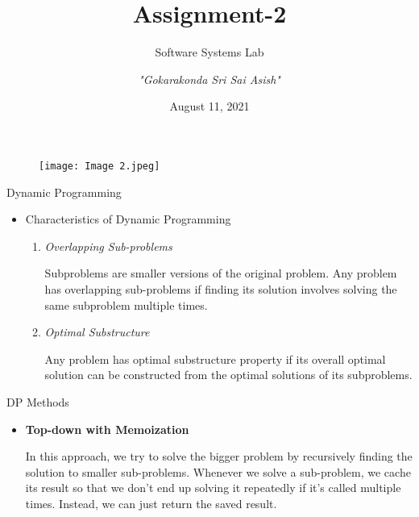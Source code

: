\documentclass{beamer}
\title{Assignment-2}
\subtitle{Software Systems Lab}
\author{\textit{"Gokarakonda Sri Sai Asish"}}
\institute{IIT Dharwad \newline \url{https://www.iitdh.ac.in/}}
\date{August 11, 2021}
\begin{document}
\begin{frame}%
\titlepage 
\begin{figure}
\centering%
  \texttt{[image: Image 2.jpeg]} %
\end{figure}
\end{frame}


\begin{frame}{Dynamic Programming}%
\transblindshorizontal%
\label{dyano}
\begin{itemize}%
\item Characteristics of Dynamic Programming
   \begin{enumerate}
    \item \textit{Overlapping Sub-problems} 
      \begin{block}{1}%
      Subproblems are smaller versions of the original problem. Any problem has overlapping sub-problems if finding its solution involves solving the same subproblem multiple times. 
      \end{block}
      \item \textit{Optimal Substructure}      
      \begin{block}{2}%
        Any problem has optimal substructure property if its overall optimal solution can be constructed from the optimal solutions of its subproblems.
      \end{block}
   \end{enumerate}
   \end{itemize}
\end{frame}


\begin{frame}[t]{DP Methods}%
\transblindshorizontal%
\vspace{10pt}
\begin{itemize}%
  \item \textbf{Top-down with Memoization}  %
   \begin{block}{1}%
   In this approach, we try to solve the bigger problem by recursively finding the solution to smaller sub-problems. Whenever we solve a sub-problem, we cache its result so that we don't end up solving it repeatedly if it's called multiple times. Instead, we can just return the saved result.
   \end{block}
  \end{itemize}
\end{frame}
\end{document}
